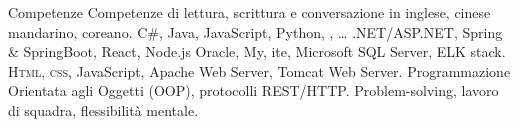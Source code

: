 
\begin{rubric}{Competenze}
\entry*[Lingue]
    Competenze di lettura, scrittura e conversazione in inglese, cinese mandarino, coreano.
    C\#, Java, JavaScript, Python, , \ldots
{}
    .NET/ASP.NET, Spring \& SpringBoot, React, Node.js
    Oracle, My, ite, Microsoft SQL Server, ELK stack.
    \textsc{Html, css}, JavaScript, Apache Web Server, Tomcat Web Server.
    Programmazione Orientata agli Oggetti (OOP), protocolli REST/HTTP.
    Problem-solving, lavoro di squadra, flessibilità mentale.
\end{rubric}
